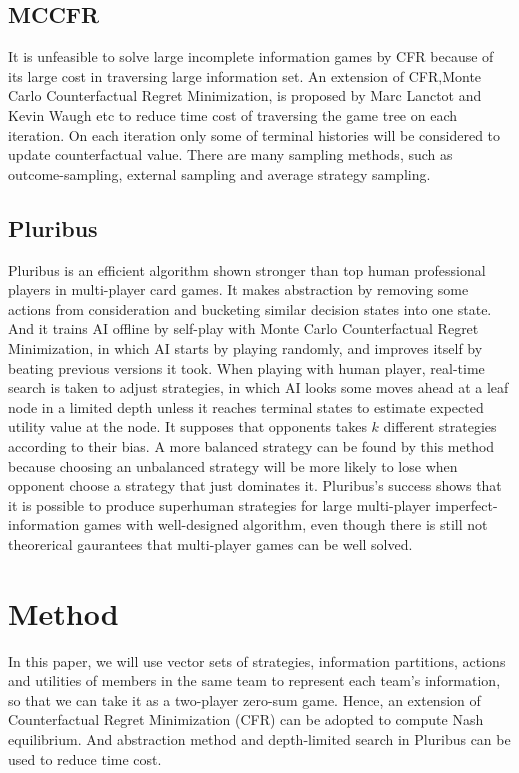 \documentclass[english,preprint,JIP]{ipsj}
\begin{document}
\subsection{MCCFR}
It is unfeasible to solve large incomplete information games by CFR because of its large cost in traversing large information set. An extension of CFR,Monte Carlo Counterfactual Regret Minimization\cite{lanctot2009monte}, is proposed by Marc Lanctot and Kevin Waugh etc to reduce time cost of traversing the game tree on each iteration. On each iteration only some of terminal histories will be considered to update counterfactual value. There are many sampling methods, such as outcome-sampling, external sampling and average strategy sampling.
\subsection{Pluribus}

Pluribus\cite{brown2019superhuman} is an efficient algorithm shown stronger than top human professional players in multi-player card games. It makes abstraction by removing some actions from consideration and bucketing similar decision states into one state. And it trains AI offline by self-play with Monte Carlo Counterfactual Regret Minimization, in which AI starts by playing randomly, and improves itself by beating previous versions it took. When playing with human player, real-time search is taken to adjust strategies, in which AI looks some moves ahead at a leaf node in a limited depth unless it reaches terminal states to estimate expected utility value at the node. It supposes that opponents takes $k$ different strategies according to their bias. A more balanced strategy can be found by this method because choosing an unbalanced strategy will be more likely to lose when opponent choose a strategy that just dominates it. Pluribus’s
success shows that it is possible to produce superhuman strategies for large multi-player imperfect-information games with well-designed algorithm, even though there is still not theorerical gaurantees that multi-player games can be well solved. 

\section{Method}

In this paper, we will use vector sets of strategies, information partitions, actions and utilities of members in the same team to represent each team’s information, so that we can take it as a two-player zero-sum game. Hence, an extension of Counterfactual Regret Minimization (CFR) can be adopted to compute Nash equilibrium. And abstraction method and depth-limited search in Pluribus can be used to reduce time cost.
















\printbibliography
\end{document}
